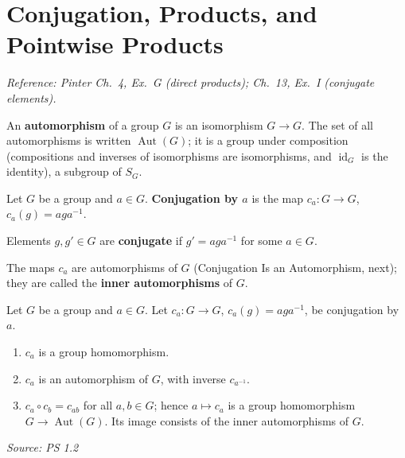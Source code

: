 \documentclass[11pt]{report}
\newcommand{\srcline}[1]{\par\hfill{\footnotesize\textit{Source: #1}}}
\begin{document}
\section{Conjugation, Products, and Pointwise Products}\label{sec:conjugation-products}

\textit{Reference: Pinter Ch.\ 4, Ex.\ G (direct products); Ch.\ 13, Ex.\ I (conjugate elements).}

\begin{defbox}\label{def:automorphisms-aut-g}
An \textbf{automorphism} of a group $G$ is an isomorphism $G \to G$. The set of all automorphisms is written $\operatorname{Aut}(G)$; it is a group under composition (compositions and inverses of isomorphisms are isomorphisms, and $\operatorname{id}_G$ is the identity), a subgroup of $S_G$.
\end{defbox}

\begin{defbox}[{Conjugation}]\label{def:conjugation-conjugate-elements-inner}
Let $G$ be a group and $a \in G$. \textbf{Conjugation by $a$} is the map $c_a: G \to G$, $c_a(g) = aga^{-1}$.
\end{defbox}

\begin{defbox}\label{def:conjugate-elements}
Elements $g, g' \in G$ are \textbf{conjugate} if $g' = aga^{-1}$ for some $a \in G$.
\end{defbox}

\begin{defbox}\label{def:inner-automorphism}
The maps $c_a$ are automorphisms of $G$ (Conjugation Is an Automorphism, next); they are called the \textbf{inner automorphisms} of $G$.
\end{defbox}

\begin{propbox}\label{prop:conjugation-automorphism}
Let $G$ be a group and $a \in G$. Let $c_a: G \to G$, $c_a(g) = a g a^{-1}$, be conjugation by $a$.
\begin{enumerate}
    \item $c_a$ is a group homomorphism.
    \item $c_a$ is an automorphism of $G$, with inverse $c_{a^{-1}}$.
    \item $c_a \circ c_b = c_{ab}$ for all $a, b \in G$; hence $a \mapsto c_a$ is a group homomorphism $G \to \operatorname{Aut}(G)$. Its image consists of the inner automorphisms of $G$.
\end{enumerate}
\srcline{PS 1.2}
\end{propbox}
\end{document}
